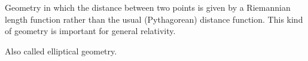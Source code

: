 Geometry in which the distance between two points is given by a Riemannian length
function rather than the usual (Pythagorean) distance function. This kind of 
geometry is important for general relativity.
\par
Also called elliptical geometry.